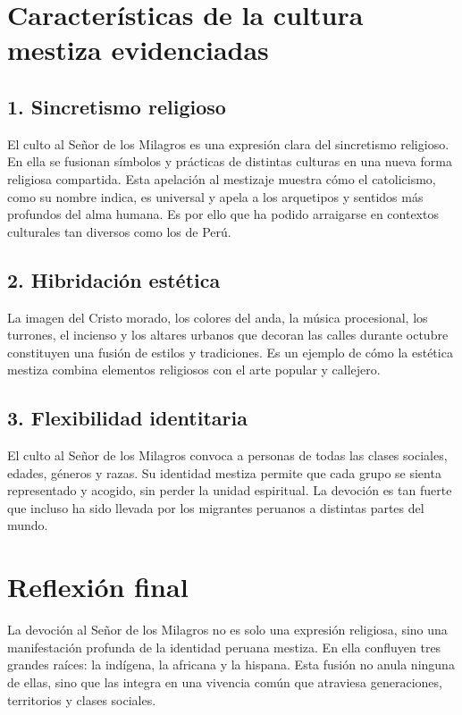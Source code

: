\documentclass[a4paper,12pt]{article}
\begin{document}
		\section{Características de la cultura mestiza evidenciadas}
		
		\subsection{1. Sincretismo religioso}
		El culto al Señor de los Milagros es una expresión clara del sincretismo religioso. En ella se fusionan símbolos y prácticas de distintas culturas en una nueva forma religiosa compartida. Esta apelación al mestizaje muestra cómo el catolicismo, como su nombre indica, es universal y apela a los arquetipos y sentidos más profundos del alma humana. Es por ello que ha podido arraigarse en contextos culturales tan diversos como los de Perú.
		
		\subsection{2. Hibridación estética}
		La imagen del Cristo morado, los colores del anda, la música procesional, los turrones, el incienso y los altares urbanos que decoran las calles durante octubre constituyen una fusión de estilos y tradiciones. Es un ejemplo de cómo la estética mestiza combina elementos religiosos con el arte popular y callejero.
		
		\subsection{3. Flexibilidad identitaria}
		El culto al Señor de los Milagros convoca a personas de todas las clases sociales, edades, géneros y razas. Su identidad mestiza permite que cada grupo se sienta representado y acogido, sin perder la unidad espiritual. La devoción es tan fuerte que incluso ha sido llevada por los migrantes peruanos a distintas partes del mundo.
		
		\section{Reflexión final}
		
		La devoción al Señor de los Milagros no es solo una expresión religiosa, sino una manifestación profunda de la identidad peruana mestiza. En ella confluyen tres grandes raíces: la indígena, la africana y la hispana. Esta fusión no anula ninguna de ellas, sino que las integra en una vivencia común que atraviesa generaciones, territorios y clases sociales.
		
\end{document}

